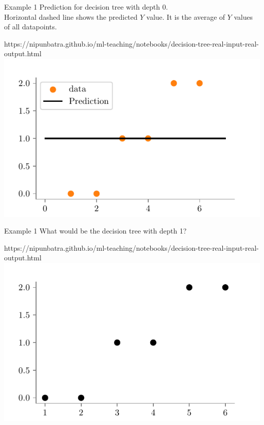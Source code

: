 \documentclass[usenames,dvipsnames]{beamer}
\begin{document}
\begin{frame}{Example 1}
Prediction for decision tree with depth 0.\\
Horizontal dashed line shows the predicted $Y$ value. It is the average of $Y$ values of all datapoints.\\
\begin{center}
	\begin{notebookbox}{https://nipunbatra.github.io/ml-teaching/notebooks/decision-tree-real-input-real-output.html}
		\includegraphics{../assets/decision-trees/figures/ri-ro-depth-0.pdf}	
	  \end{notebookbox}
\end{center}
\end{frame}


\begin{frame}{Example 1}
What would be the decision tree with depth 1?
\begin{center}
	\begin{notebookbox}{https://nipunbatra.github.io/ml-teaching/notebooks/decision-tree-real-input-real-output.html}
		\includegraphics{../assets/decision-trees/figures/ri-ro-dataset.pdf}
	  \end{notebookbox}
\end{center}
\end{frame}
\end{document}
